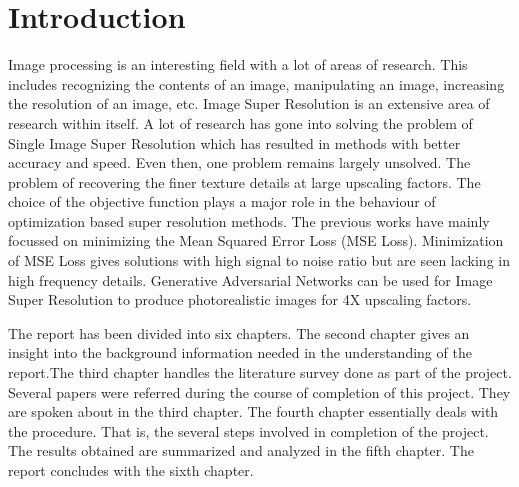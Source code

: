 \chapter{Introduction}
Image processing is an interesting field with a lot of areas of research. This includes recognizing the contents of an image, manipulating an image, increasing the resolution of an image, etc. Image Super Resolution is an extensive area of research within itself. A lot of research has gone into solving the problem of Single Image Super Resolution which has resulted in methods with better accuracy and speed. Even then, one problem remains largely unsolved. The problem of recovering the finer texture details at large upscaling factors. The choice of the objective function plays a major role in the behaviour of optimization based super resolution methods. The previous works have mainly focussed on minimizing the Mean Squared Error Loss (MSE Loss). Minimization of MSE Loss gives solutions with high signal to noise ratio but are seen lacking in high frequency details. Generative Adversarial Networks can be used for Image Super Resolution to produce photorealistic images for 4X upscaling factors.   

The report has been divided into six chapters. The second chapter gives an insight into the background information needed in the understanding of the report.The third chapter handles the literature survey done as part of the project. Several papers were referred during the course of completion of this project. They are spoken about in the third chapter. The fourth chapter essentially deals with the procedure. That is, the several steps involved in completion of the project. The results obtained are summarized and analyzed in the fifth chapter. The report concludes with the sixth chapter. 